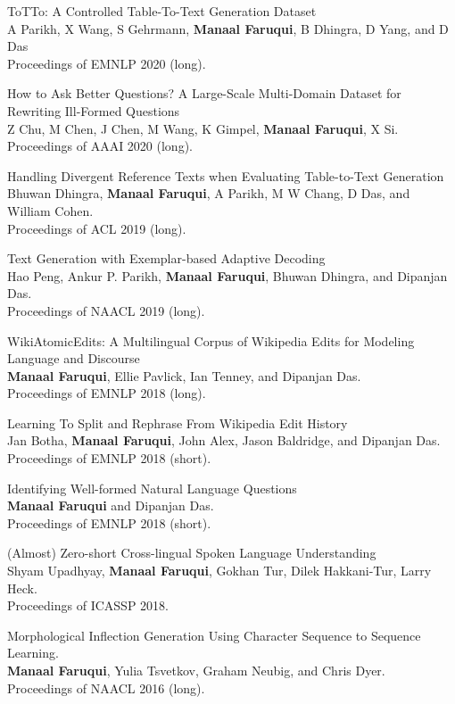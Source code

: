 \documentclass[margin,line]{res}
\begin{document}
\begin{resume}
ToTTo: A Controlled Table-To-Text Generation Dataset\\
A Parikh, X Wang, S Gehrmann, \textbf{Manaal Faruqui}, B Dhingra, D Yang, and D Das\\
Proceedings of EMNLP 2020 (long).

How to Ask Better Questions? A Large-Scale Multi-Domain Dataset for Rewriting Ill-Formed Questions\\
Z Chu, M Chen, J Chen, M Wang, K Gimpel, \textbf{Manaal Faruqui}, X Si.\\
Proceedings of AAAI 2020 (long).

Handling Divergent Reference Texts when Evaluating Table-to-Text Generation\\
Bhuwan Dhingra, \textbf{Manaal Faruqui}, A Parikh, M W Chang, D Das, and William Cohen.\\
Proceedings of ACL 2019 (long).

Text Generation with Exemplar-based Adaptive Decoding\\
Hao Peng, Ankur P. Parikh, \textbf{Manaal Faruqui}, Bhuwan Dhingra, and Dipanjan Das.\\
Proceedings of NAACL 2019 (long).

WikiAtomicEdits: A Multilingual Corpus of Wikipedia Edits for Modeling Language and Discourse\\
\textbf{Manaal Faruqui}, Ellie Pavlick, Ian Tenney, and Dipanjan Das.\\
Proceedings of EMNLP 2018 (long).

Learning To Split and Rephrase From Wikipedia Edit History\\
Jan Botha, \textbf{Manaal Faruqui}, John Alex, Jason Baldridge, and Dipanjan Das.\\
Proceedings of EMNLP 2018 (short).

Identifying Well-formed Natural Language Questions\\
\textbf{Manaal Faruqui} and Dipanjan Das.\\
Proceedings of EMNLP 2018 (short).

(Almost) Zero-short Cross-lingual Spoken Language Understanding\\
Shyam Upadhyay, \textbf{Manaal Faruqui}, Gokhan Tur, Dilek Hakkani-Tur, Larry Heck.\\
Proceedings of ICASSP 2018.

Morphological Inflection Generation Using Character Sequence to Sequence Learning.\\
\textbf{Manaal Faruqui}, Yulia Tsvetkov, Graham Neubig, and Chris Dyer.\\
Proceedings of NAACL 2016 (long).


\end{resume}
\end{document}
